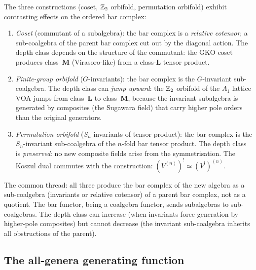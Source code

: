 \begin{remark}%
\label{rem:coset-orbifold-comparison}%
%
%
%
The three constructions (coset, $\mathbb{Z}_2$ orbifold,
permutation orbifold) exhibit contrasting effects on the
ordered bar complex:
\begin{enumerate}[label=\textup{(\roman*)},nosep]
\item \emph{Coset} (commutant of a subalgebra):
 the bar complex is a \emph{relative cotensor}, a
 sub-coalgebra of the parent bar complex cut out by
 the diagonal action. The depth class depends on the
 structure of the commutant: the GKO coset produces
 class~$\mathbf{M}$ (Virasoro-like) from a
 class-$\mathbf{L}$ tensor product.

\item \emph{Finite-group orbifold} ($G$-invariants):
 the bar complex is the $G$-invariant sub-coalgebra.
 The depth class can \emph{jump upward}: the $\mathbb{Z}_2$
 orbifold of the $A_1$ lattice VOA jumps from
 class~$\mathbf{L}$ to class~$\mathbf{M}$, because
 the invariant subalgebra is generated by composites
 (the Sugawara field) that carry higher pole orders
 than the original generators.

\item \emph{Permutation orbifold} ($S_n$-invariants of
 tensor product): the bar complex is the $S_n$-invariant
 sub-coalgebra of the $n$-fold bar tensor product.
 The depth class is \emph{preserved}: no new composite
 fields arise from the symmetrisation. The Koszul dual
 commutes with the construction:
 $(V^{(n)})^! \simeq (V^!)^{(n)}$.
\end{enumerate}
The common thread: all three produce the bar complex of
the new algebra as a sub-coalgebra (invariants or
relative cotensor) of a parent bar complex, not as a
quotient. The bar functor, being a coalgebra functor,
sends subalgebras to sub-coalgebras. The depth class
can increase (when invariants force generation by
higher-pole composites) but cannot decrease (the
invariant sub-coalgebra inherits all obstructions of
the parent).
\end{remark}


\subsection{The all-genera generating function}%
\label{subsec:all-genera-generating}%
%


